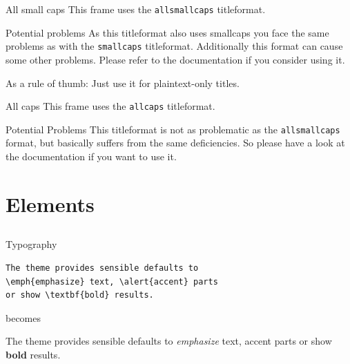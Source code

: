 \documentclass[10pt, fleqn, dvipsnames]{beamer}
\begin{document}
\begin{frame}{All small caps}
	This frame uses the \texttt{allsmallcaps} titleformat.

	\begin{alertblock}{Potential problems}
		As this titleformat also uses smallcaps you face the same problems as with the \texttt{smallcaps} titleformat. Additionally this format can cause some other problems. Please refer to the documentation if you consider using it.

		As a rule of thumb: Just use it for plaintext-only titles.
	\end{alertblock}
\end{frame}


\begin{frame}{All caps}
	This frame uses the \texttt{allcaps} titleformat.

	\begin{alertblock}{Potential Problems}
		This titleformat is not as problematic as the \texttt{allsmallcaps} format, but basically suffers from the same deficiencies. So please have a look at the documentation if you want to use it.
	\end{alertblock}
\end{frame}



\section{Elements}
\subsection{}  %


\begin{frame}[fragile]{Typography}
      \begin{verbatim}The theme provides sensible defaults to
\emph{emphasize} text, \alert{accent} parts
or show \textbf{bold} results.\end{verbatim}

  \begin{center}becomes\end{center}

  The theme provides sensible defaults to \emph{emphasize} text,
  \alert{accent} parts or show \textbf{bold} results.
\end{frame}
\end{document}
